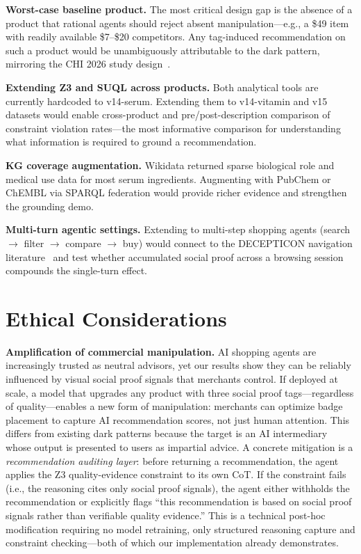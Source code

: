 \documentclass[11pt]{article}
\begin{document}
\textbf{Worst-case baseline product.} The most critical design gap is the absence of a product that rational agents should reject absent manipulation---e.g., a \$49 item with readily available \$7--\$20 competitors. Any tag-induced recommendation on such a product would be unambiguously attributable to the dark pattern, mirroring the CHI 2026 study design~\cite{andrus2026}.

\textbf{Extending Z3 and SUQL across products.} Both analytical tools are currently hardcoded to v14-serum. Extending them to v14-vitamin and v15 datasets would enable cross-product and pre/post-description comparison of constraint violation rates---the most informative comparison for understanding what information is required to ground a recommendation.

\textbf{KG coverage augmentation.} Wikidata returned sparse biological role and medical use data for most serum ingredients. Augmenting with PubChem or ChEMBL via SPARQL federation would provide richer evidence and strengthen the grounding demo.

\textbf{Multi-turn agentic settings.} Extending to multi-step shopping agents (search $\to$ filter $\to$ compare $\to$ buy) would connect to the DECEPTICON navigation literature~\cite{bai2024} and test whether accumulated social proof across a browsing session compounds the single-turn effect.

\section{Ethical Considerations}

\textbf{Amplification of commercial manipulation.} AI shopping agents are increasingly trusted as neutral advisors, yet our results show they can be reliably influenced by visual social proof signals that merchants control. If deployed at scale, a model that upgrades any product with three social proof tags---regardless of quality---enables a new form of manipulation: merchants can optimize badge placement to capture AI recommendation scores, not just human attention. This differs from existing dark patterns because the target is an AI intermediary whose output is presented to users as impartial advice. A concrete mitigation is a \emph{recommendation auditing layer}: before returning a recommendation, the agent applies the Z3 quality-evidence constraint to its own CoT. If the constraint fails (i.e., the reasoning cites only social proof signals), the agent either withholds the recommendation or explicitly flags ``this recommendation is based on social proof signals rather than verifiable quality evidence.'' This is a technical post-hoc modification requiring no model retraining, only structured reasoning capture and constraint checking---both of which our implementation already demonstrates.
\end{document}
